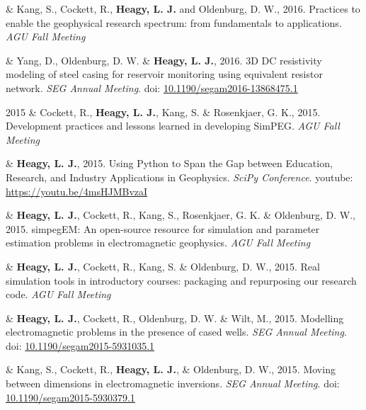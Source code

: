 \documentclass[a4paper, 11pt]{article}
\newcommand{\doi}[1]{doi: \href{https://doi.org/#1}{#1}}
\newcommand{\youtube}[1]{youtube: \href{https://youtu.be/XY3Tq9Wd1\_A}{#1}}
\begin{document}
\begin{entryright}
& Kang, S., Cockett, R., \textbf{Heagy, L. J.} and Oldenburg, D. W., 2016. Practices to enable the geophysical research spectrum: from fundamentals to applications. \emph{AGU Fall Meeting}
\end{entryright}

\begin{entryright}
& Yang, D., Oldenburg, D. W. \& \textbf{Heagy, L. J.}, 2016. 3D DC resistivity modeling of steel casing for reservoir monitoring using equivalent resistor network. \emph{SEG Annual Meeting}. \doi{10.1190/segam2016-13868475.1}
\end{entryright}

\begin{entryright}
2015 & Cockett, R., \textbf{Heagy, L. J.}, Kang, S. \& Rosenkjaer, G. K., 2015. Development practices and lessons learned in developing SimPEG. \emph{AGU Fall Meeting}
\end{entryright}

\begin{entryright}
& \textbf{Heagy, L. J.}, 2015. Using Python to Span the Gap between Education, Research, and Industry Applications in Geophysics. \emph{SciPy Conference}. \youtube{https://youtu.be/4msHJMBvzaI}
\end{entryright}

\begin{entryright}
& \textbf{Heagy, L. J.}, Cockett, R., Kang, S., Rosenkjaer, G. K. \& Oldenburg, D. W., 2015. simpegEM: An open-source resource for simulation and parameter estimation problems in electromagnetic geophysics. \emph{AGU Fall Meeting}
\end{entryright}

\begin{entryright}
& \textbf{Heagy, L. J.}, Cockett, R., Kang, S. \& Oldenburg, D. W., 2015. Real simulation tools in introductory courses: packaging and repurposing our research code. \emph{AGU Fall Meeting}
\end{entryright}

\begin{entryright}
& \textbf{Heagy, L. J.}, Cockett, R., Oldenburg, D. W. \& Wilt, M., 2015. Modelling electromagnetic problems in the presence of cased wells. \emph{SEG Annual Meeting}. \doi{10.1190/segam2015-5931035.1}
\end{entryright}

\begin{entryright}
& Kang, S., Cockett, R., \textbf{Heagy, L. J.}, \& Oldenburg, D. W., 2015. Moving between dimensions in electromagnetic inversions. \emph{SEG Annual Meeting}. \doi{10.1190/segam2015-5930379.1}
\end{entryright}
\end{document}
